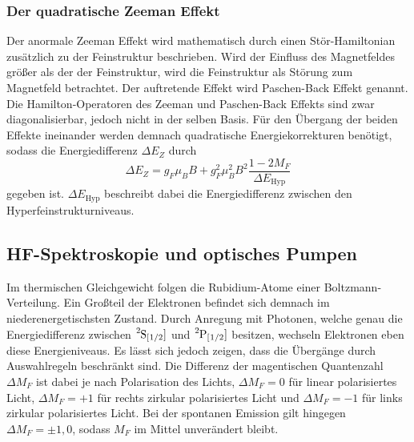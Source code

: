 \subsubsection{Der quadratische Zeeman Effekt}
Der anormale Zeeman Effekt wird mathematisch durch einen Stör-Hamiltonian
zusätzlich zu der Feinstruktur beschrieben. Wird der Einfluss des 
Magnetfeldes größer als der der Feinstruktur, wird die Feinstruktur
als Störung zum Magnetfeld betrachtet. Der auftretende Effekt wird 
Paschen-Back Effekt genannt. Die Hamilton-Operatoren des Zeeman und 
Paschen-Back Effekts sind zwar diagonalisierbar, jedoch nicht in der 
selben Basis. Für den Übergang der beiden Effekte ineinander werden 
demnach quadratische Energiekorrekturen benötigt, sodass die 
Energiedifferenz $\Delta E_Z$ durch 
\begin{equation}
    \Delta E_Z=g_F\mu_BB+g_F^2\mu_B^2B^2\frac{1-2M_F}{\Delta E_\text{Hyp}}
    \label{eqn:zeemanquadrat}
\end{equation}
gegeben ist. $\Delta E_\text{Hyp}$ beschreibt dabei die Energiedifferenz
zwischen den Hyperfeinstrukturniveaus.

\subsection{HF-Spektroskopie und optisches Pumpen}
Im thermischen Gleichgewicht folgen die Rubidium-Atome einer 
Boltzmann-Verteilung. Ein Großteil der Elektronen befindet sich 
demnach im niederenergetischsten Zustand. Durch Anregung mit Photonen,
welche genau die Energiedifferenz zwischen $\ce{^{2}S_[1/2]}$ und 
$\ce{^{2}P_[1/2]}$ besitzen, wechseln Elektronen eben diese Energieniveaus.
Es lässt sich jedoch zeigen, dass die Übergänge durch Auswahlregeln 
beschränkt sind. Die Differenz der magentischen Quantenzahl $\Delta M_F$
ist dabei je nach Polarisation des Lichts, $\Delta M_F=0$ für 
linear polarisiertes Licht, $\Delta M_F=+1$ für rechts zirkular
polarisiertes Licht und $\Delta M_F=-1$ für links zirkular polarisiertes
Licht. Bei der spontanen Emission gilt hingegen $\Delta M_F =\pm 1,0$, 
sodass $M_F$ im Mittel unverändert bleibt. 

